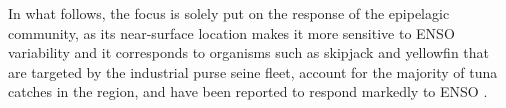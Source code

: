 
In what follows, the focus is solely put on the response of the epipelagic community, as its near-surface location makes it more sensitive to ENSO variability \citep{lemezoNaturalVariabilityMarine2016} and it corresponds to organisms such as skipjack and yellowfin that are targeted by the industrial purse seine fleet, account for the majority of tuna catches in the region, and have been reported to respond markedly to ENSO \citep{lehodeyNinoSouthernOscillation1997}.
